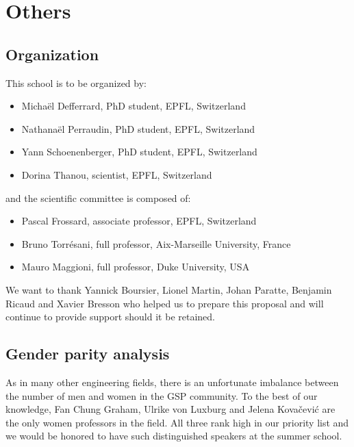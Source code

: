 \documentclass[a4paper]{scrartcl}
\begin{document}
\section{Others}

\subsection{Organization}

This school is to be organized by:
\begin{itemize}
	\setlength{\itemsep}{0pt} \setlength{\parskip}{0pt}
	\item Michaël Defferrard, PhD student, EPFL, Switzerland
	\item Nathanaël Perraudin, PhD student, EPFL, Switzerland
	\item Yann Schoenenberger, PhD student, EPFL, Switzerland
	\item Dorina Thanou, scientist, EPFL, Switzerland
\end{itemize}
and the scientific committee is composed of:
\begin{itemize}
	\setlength{\itemsep}{0pt} \setlength{\parskip}{0pt}
	\item Pascal Frossard, associate professor, EPFL, Switzerland
	\item Bruno Torrésani, full professor, Aix-Marseille University, France
	\item Mauro Maggioni, full professor, Duke University, USA
\end{itemize}

We want to thank Yannick Boursier, Lionel Martin, Johan Paratte, Benjamin Ricaud
and Xavier Bresson who helped us to prepare this proposal and will continue to
provide support should it be retained.

\subsection{Gender parity analysis}

As in many other engineering fields, there is an unfortunate imbalance between
the number of men and women in the GSP community. To the best of our knowledge,
Fan Chung Graham, Ulrike von Luxburg and Jelena Kovačević are the only women
professors in the field. All three rank high in our priority list and we would
be honored to have such distinguished speakers at the summer school.
\end{document}
